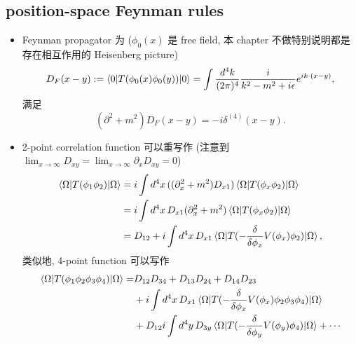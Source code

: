 \subsection{position-space Feynman rules}
\begin{itemize}
	\item Feynman propagator 为 ($\phi_0(x)$ 是 free field, 本 chapter 不做特别说明都是存在相互作用的 Heisenberg picture)
	\begin{equation}
		D_F(x - y) := \braket{0 | T(\phi_0(x) \phi_0(y)) | 0} = \int \frac{d^4 k}{(2 \pi)^4} \frac{i}{k^2 - m^2 + i \epsilon} e^{i k \cdot (x - y)},
	\end{equation}
	满足
	\begin{equation}
		(\partial^2 + m^2) D_F(x - y) = - i \delta^{(4)}(x - y).
	\end{equation}
	
	\item 2-point correlation function 可以重写作 (注意到 $\lim_{x \rightarrow \infty} D_{x y} = \lim_{x \rightarrow \infty} \partial_x D_{x y} = 0$)
	\begin{align}
		\braket{\Omega | T(\phi_1 \phi_2) | \Omega} &= i \int d^4 x \, ((\partial_x^2 + m^2) D_{x 1}) \braket{\Omega | T(\phi_x \phi_2) | \Omega} \notag \\
		&= i \int d^4 x \, D_{x 1} (\partial_x^2 + m^2) \braket{\Omega | T(\phi_x \phi_2) | \Omega} \notag \\
		&= D_{1 2} + i \int d^4 x \, D_{x 1} \braket{\Omega | T(- \frac{\delta}{\delta \phi_x} V(\phi_x) \phi_2) | \Omega},
	\end{align}
	类似地, 4-point function 可以写作
	\begin{align}
		\braket{\Omega | T(\phi_1 \phi_2 \phi_3 \phi_4) | \Omega} =& D_{1 2} D_{3 4} + D_{1 3} D_{2 4} + D_{1 4} D_{2 3} \notag \\
		& + i \int d^4 x \, D_{x 1} \braket{\Omega | T(- \frac{\delta}{\delta \phi_x} V(\phi_x) \phi_2 \phi_3 \phi_4) | \Omega} \notag \\
		& + D_{1 2} i \int d^4 y \, D_{3 y} \braket{\Omega | T(- \frac{\delta}{\delta \phi_y} V(\phi_y) \phi_4) | \Omega} + \cdots
	\end{align}
	

\end{itemize}
